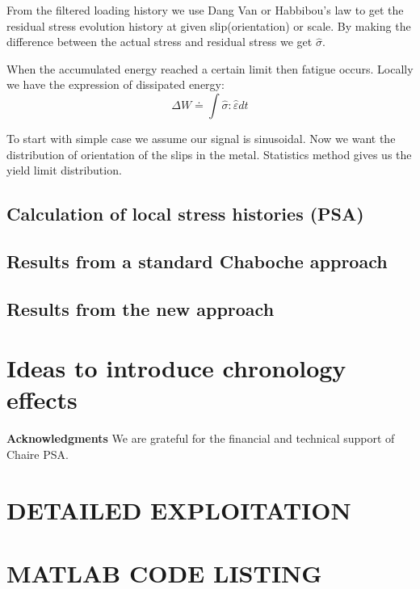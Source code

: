 \documentclass[3p,times,procedia,number]{elsarticle}
\begin{document}
From the filtered loading history we use Dang Van or Habbibou's law to get the residual stress evolution history at given slip(orientation) or scale. By making the difference between the actual stress and residual stress we get $\hat{\sigma}$. 

When the accumulated energy reached a certain limit then fatigue occurs. Locally we have the expression of dissipated energy:
$$\Delta W\doteq\int\hat{\sigma}:\hat{\varepsilon}dt$$

To start with simple case we assume our signal is sinusoidal. Now we want the distribution of orientation of the slips in the metal. Statistics method gives us the yield limit distribution.

\subsection{Calculation of local stress histories (PSA)}
\subsection{Results from a standard Chaboche approach}
\subsection{Results from the new approach}
\section{Ideas to introduce chronology effects}

\vspace{6pt}
\noindent
\textbf{Acknowledgments}
\vspace{6pt}
We are grateful for the financial and technical support of Chaire PSA.


\clearpage




\clearpage
\appendix
\appendixpage
{}
\begin{subappendices}
	\section{DETAILED EXPLOITATION}
	
	
	    
	\section{MATLAB CODE LISTING}
	
	
\end{subappendices}
\end{document}
